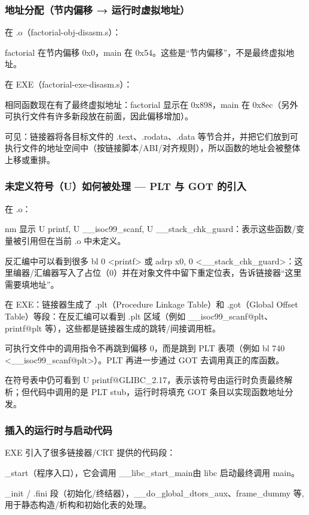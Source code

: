 \documentclass[a4paper]{article}
\begin{document}
\subsubsection{地址分配（节内偏移 → 运行时虚拟地址）}
在 .o（factorial-obj-disasm.s）：

factorial 在节内偏移 0x0，main 在 0x54。这些是“节内偏移”，不是最终虚拟地址。

在 EXE（factorial-exe-disasm.s）：

相同函数现在有了最终虚拟地址：factorial 显示在 0x898，main 在 0x8ec（另外可执行文件有许多新段放在前面，因此偏移增加）。

可见：链接器将各目标文件的 .text、.rodata、.data 等节合并，并把它们放到可执行文件的地址空间中（按链接脚本/ABI/对齐规则），所以函数的地址会被整体上移或重排。

\subsubsection{未定义符号（U）如何被处理 — PLT 与 GOT 的引入}
在 .o： 

nm 显示 U printf, U \_\_isoc99\_scanf, U \_\_stack\_chk\_guard：表示这些函数/变量被引用但在当前 .o 中未定义。

反汇编中可以看到很多 bl 0 <printf> 或 adrp x0, 0 <\_\_stack\_chk\_guard>：这里编器/汇编器写入了占位（0）并在对象文件中留下重定位表，告诉链接器“这里需要填地址”。

在 EXE：链接器生成了 .plt（Procedure Linkage Table）和 .got（Global Offset Table）等段：在反汇编可以看到 .plt 区域（例如 \_\_isoc99\_scanf@plt、printf@plt 等），这些都是链接器生成的跳转/间接调用桩。

可执行文件中的调用指令不再跳到偏移 0，而是跳到 PLT 表项（例如 bl 740 <\_\_isoc99\_scanf@plt>）。PLT 再进一步通过 GOT 去调用真正的库函数。

在符号表中仍可看到 U printf@GLIBC\_2.17，表示该符号由运行时负责最终解析；但代码中调用的是 PLT stub，运行时将填充 GOT 条目以实现函数地址分发。

\subsubsection{插入的运行时与启动代码}
EXE 引入了很多链接器/CRT 提供的代码段：

\_start（程序入口），它会调用 \_\_libc\_start\_main由 libc 启动最终调用 main。

\_init / .fini 段（初始化/终结器），\_\_do\_global\_dtors\_aux、frame\_dummy 等,用于静态构造/析构和初始化表的处理。
\end{document}
